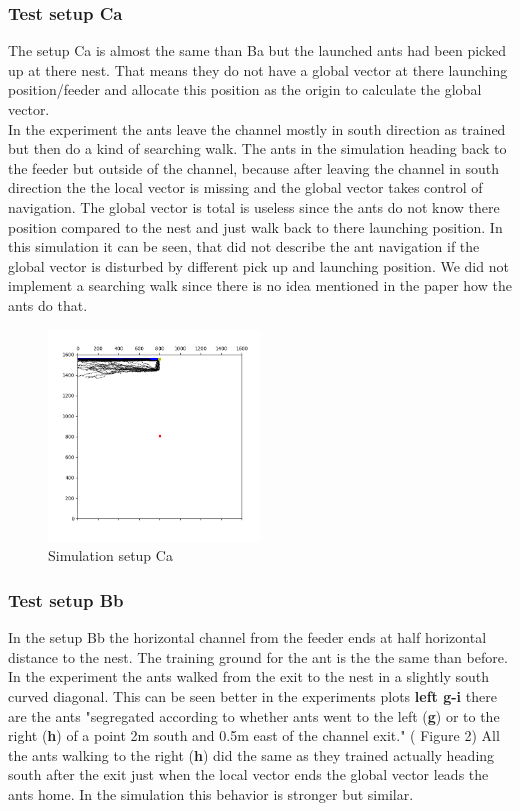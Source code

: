\documentclass[11pt]{article}
\begin{document}
	\subsubsection{Test setup Ca}
		The setup Ca is almost the same than Ba but the launched ants had been picked up at there nest. That means they do not have a global vector at there launching position/feeder and allocate this position as the origin to calculate the global vector. \\
In the experiment the ants leave the channel mostly in south direction as trained but then do a kind of searching walk. The ants in the simulation heading back to the feeder but outside of the channel, because after leaving the channel in south direction the the local vector is missing and the global vector takes control of navigation. The global vector is total is useless since the ants do not know there position compared to the nest and just walk back to there launching position. In this simulation it can be seen, that \cite{wehner} did not describe the ant navigation if the global vector is disturbed by different pick up and launching position. We did not implement a searching walk since there is no idea mentioned in the paper how the ants do that.

\begin{figure}[H]
	\centering
	\includegraphics[width=0.5\textwidth]{test_Ca.png}
	\caption{Simulation setup Ca}
	\label{fig:Ca}
\end{figure}

	\subsubsection{Test setup Bb}
		In the setup Bb the horizontal channel from the feeder ends at half horizontal distance to the nest. The training ground for the ant is the the same than before. \\
In the experiment the ants walked from the exit to the nest in a slightly south curved diagonal. This can be seen better in the experiments plots \textbf{left g-i} there are the ants "segregated according to whether ants went to the left (\textbf{g}) or to the right (\textbf{h}) of a point 2m south and 0.5m east of the channel exit." (\cite{wehner} Figure 2) All the ants walking to the right (\textbf{h}) did the same as they trained actually heading south after the exit just when the local vector ends the global vector leads the ants home. In the simulation this behavior is stronger but similar.
\end{document}
